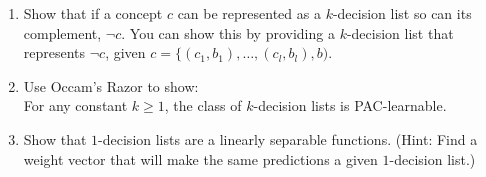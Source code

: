 \begin{enumerate}
\item \relax[8 points] Show that if a concept $c$ can be represented
  as a $k$-decision list so can its complement, $\neg c$. You can show
  this by providing a $k$-decision list that represents $\neg c$,
  given $c = \{(c_{1},b_{1}), \ldots, (c_{l},b_{l}),b)$.

\item \relax[9 points] Use  Occam's Razor to show: \\
  For any constant $k \geq 1$, the class of $k$-decision lists is
  PAC-learnable.

\item \relax[8 points] Show that $1$-decision lists are a linearly
  separable functions. (Hint: Find a weight vector that will make the
  same predictions a given $1$-decision list.)

\end{enumerate}


